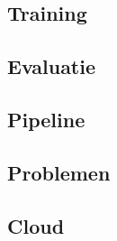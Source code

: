 \subsection{Training}
\subsection{Evaluatie}
\subsection{Pipeline}
\subsection{Problemen}
\subsection{Cloud}


